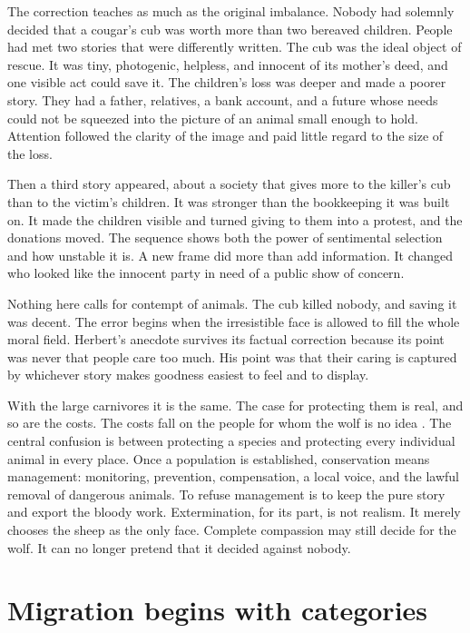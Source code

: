 \documentclass[12pt,a4paper]{book}
\begin{document}
The correction teaches as much as the original imbalance. Nobody had solemnly decided that a cougar's cub was worth more than two bereaved children. People had met two stories that were differently written. The cub was the ideal object of rescue. It was tiny, photogenic, helpless, and innocent of its mother's deed, and one visible act could save it. The children's loss was deeper and made a poorer story. They had a father, relatives, a bank account, and a future whose needs could not be squeezed into the picture of an animal small enough to hold. Attention followed the clarity of the image and paid little regard to the size of the loss.

Then a third story appeared, about a society that gives more to the killer's cub than to the victim's children. It was stronger than the bookkeeping it was built on. It made the children visible and turned giving to them into a protest, and the donations moved. The sequence shows both the power of sentimental selection and how unstable it is. A new frame did more than add information. It changed who looked like the innocent party in need of a public show of concern.

Nothing here calls for contempt of animals. The cub killed nobody, and saving it was decent. The error begins when the irresistible face is allowed to fill the whole moral field. Herbert's anecdote survives its factual correction because its point was never that people care too much. His point was that their caring is captured by whichever story makes goodness easiest to feel and to display.

With the large carnivores it is the same. The case for protecting them is real, and so are the costs. The costs fall on the people for whom the wolf is no idea \cite{ECLargeCarnivoreFacts2026,KuijperCarnivores2016}. The central confusion is between protecting a species and protecting every individual animal in every place. Once a population is established, conservation means management: monitoring, prevention, compensation, a local voice, and the lawful removal of dangerous animals. To refuse management is to keep the pure story and export the bloody work. Extermination, for its part, is not realism. It merely chooses the sheep as the only face. Complete compassion may still decide for the wolf. It can no longer pretend that it decided against nobody.

\section{Migration begins with categories}
\end{document}
